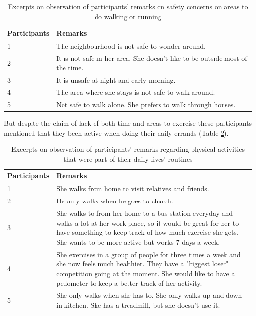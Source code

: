 \begin{table}[h!]
\begin{center}
    \caption{Excerpts on observation of participants’ remarks on safety concerns on areas to do walking or running}
    \label{table:safety_issues}
	\begin{tabular}{|p{2.5cm}|p{10.5cm}|}
		\hline
		 \textbf{Participants}&\textbf{Remarks}\\
	  \hline
	  1&The neighbourhood is not safe to wonder around.\\
	  \hline
	  2&It is not safe in her area. She doesn't like to be outside most of the time.\\
	  \hline
	  3&It is unsafe at night and early morning.\\
	  \hline
	  4&The area where she stays is not safe to walk around.\\
	  \hline
	 5&Not safe to walk alone. She prefers to walk through houses.\\
	 \hline
	\end{tabular}
  \end{center}
\end{table}

But despite the claim of lack of both time and areas to exercise these participants mentioned that they been active when doing their daily errands (Table \ref{table:daily_activity}). 

\begin{table}[h!]
\begin{center}
    \caption{Excerpts on observation of participants' remarks regarding physical activities that were part of their daily lives' routines}
    \label{table:daily_activity}
	\begin{tabular}{|p{2.5cm}|p{10.5cm}|}
		\hline
		 \textbf{Participants}&\textbf{Remarks}\\
	  \hline
	  1& She walks from home to visit relatives and friends.\\
	  \hline
	  2&He only walks when he goes to church.\\
	  \hline
	  3&She walks to from her home to a bus station everyday and walks a lot at her work place, so it would be great for her to have something to keep track of how much exercise she gets. She wants to be more active but works 7 days a week.\\
	  \hline
	  4&She exercises in a group of people for three times a week and she now feels much healthier. They have a "biggest loser" competition going at the moment. She would like to have a pedometer to keep a better track of her activity.\\
	  \hline
	 5&She only walks when she has to. She only walks up and down in kitchen. She has a treadmill, but she doesn't use it.\\
	 \hline
	\end{tabular}
  \end{center}
\end{table}


